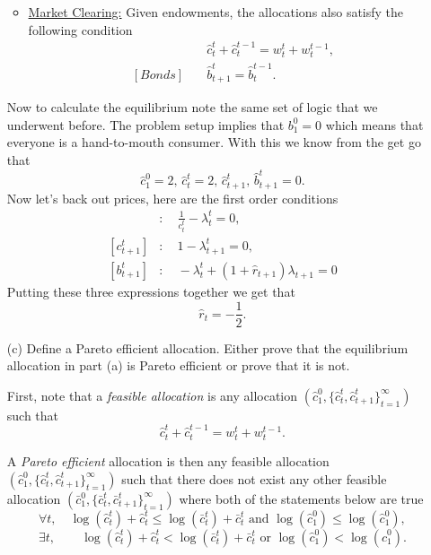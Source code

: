 \documentclass[11pt,english]{article}
\begin{document}
\begin{enumerate}
\begin{solution}
\begin{itemize}
\item \underline{Market Clearing:} Given endowments, the allocations also satisfy the following condition
\begin{align*}
[Goods]&\quad \hat{c}_t^t + \hat{c}_t^{t-1} = w_t^t + w_t^{t-1},\\
[Bonds]&\quad \hat{b}_{t+1}^t = \hat{b}_{t}^{t-1}.
\end{align*}
\end{itemize}
Now to calculate the equilibrium note the same set of logic that we underwent before. The problem setup implies that $b_1^0 = 0$ which means that everyone is a hand-to-mouth consumer. With this we know from the get go that $$\boxed{\hat{c}_1^0 = 2,\,\hat{c}_t^t = 2,\,\hat{c}_{t+1}^t,\,\hat{b}_{t+1}^t = 0.}$$Now let's back out prices, here are the first order conditions
\begin{align*}
[c_t^t]&:\quad \frac{1}{c_t^t} - \lambda_{t}^t = 0,\\
[c_{t+1}^t]&:\quad 1 - \lambda_{t+1}^t = 0,\\
[b_{t+1}^t]&:\quad -\lambda_{t}^t + (1+\hat{r}_{t+1})\lambda_{t+1} = 0
\end{align*} Putting these three expressions together we get that $$\boxed{\hat{r}_t = -\frac{1}{2}.}$$
    \end{solution}
 
    \item[(c)] Define a Pareto efficient allocation. Either prove that the
        equilibrium allocation in part (a) is Pareto efficient or prove that it
        is not.
    \begin{solution}
 First, note that a \textit{feasible allocation} is any allocation $\left(\hat{c}_1^0, \{\hat{c}_t^t, \hat{c}_{t+1}^t\}_{t=1}^\infty\right)$ such that $$\hat{c}_t^t + \hat{c}_t^{t-1} = w_t^t + w_{t}^{t-1}.$$

A \textit{Pareto efficient} allocation is then any feasible allocation $\left(\hat{c}_1^0, \{\hat{c}_t^t, \hat{c}_{t+1}^t\}_{t=1}^\infty\right)$ such that there does not exist any other feasible allocation $\left(\bar{c}_1^0, \{\bar{c}_t^t, \bar{c}_{t+1}^t\}_{t=1}^\infty\right)$ where both of the statements below are true$$\forall t,\quad \log(\hat{c}_t^t) + \hat{c}_t^t \leq \log(\bar{c}_t^t) + \bar{c}_t^t\text{ and } \log(\hat{c}_1^0) \leq \log(\hat{c}_1^0),$$
$$\exists t,\quad \quad \log(\hat{c}_t^t) + \hat{c}_t^t < \log(\bar{c}_t^t) + \bar{c}_t^t\text{ or } \log(\hat{c}_1^0) < \log(\hat{c}_1^0).$$


\end{solution}
\end{enumerate}
\end{document}
